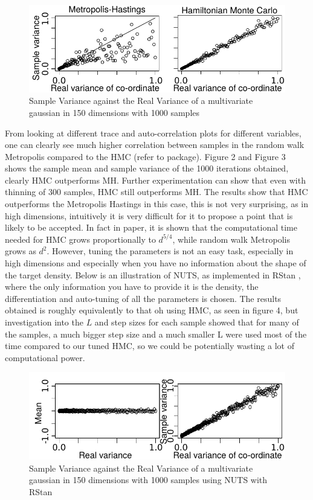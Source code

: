 \documentclass[11pt]{article}
\begin{document}
\begin{figure}[H]
\center
  \includegraphics[width=5in]{images/MHvsHM_varcoord.pdf}
  \caption{Sample Variance against the Real Variance of a multivariate gaussian in 150 dimensions with 1000 samples}
\end{figure}
From looking at different trace and auto-correlation plots for different variables, one can clearly see much higher correlation between samples in the random walk Metropolis compared to the HMC (refer to package). Figure 2 and Figure 3 shows the sample mean and sample variance of the 1000 iterations obtained, clearly HMC outperforms MH. Further experimentation can show that even with thinning of 300 samples, HMC still outperforms MH. The results show that HMC outperforms the Metropolis Hastings in this case, this is not very surprising, as in high dimensions, intuitively it is very difficult for it to propose a point that is likely to be accepted. In fact in paper, it is shown that the computational time needed for HMC grows proportionally to $d^{5/4}$, while random walk Metropolis grows as $d^{2}$. However, tuning the parameters is not an easy task, especially in high dimensions and especially when you have no information about the shape of the target density. Below is an illustration of NUTS, as implemented in RStan \cite{rstan}, where the only information you have to provide it is the density, the differentiation and auto-tuning of all the parameters is chosen. The results obtained is roughly equivalently to that oh using HMC, as seen in figure 4, but investigation into the $L$ and step sizes for each sample showed that for many of the samples, a much bigger step size and a much smaller L were used most of the time compared to our tuned HMC, so we could be potentially wasting a lot of computational power.
\begin{figure}[H]
\center
  \includegraphics[width=5in]{images/NUTS_comparisons.pdf}
  \caption{Sample Variance against the Real Variance of a multivariate gaussian in 150 dimensions with 1000 samples using NUTS with RStan}
\end{figure}
\end{document}
